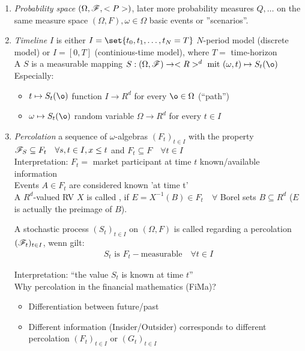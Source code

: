 \begin{enumerate}
	\item \emph{Probability space} $(\Omega,\mathscr F,<P>)$, later more probability measures $Q, \dots$ on the same measure space $(\Omega,F), \omega \in \Omega$ basic events or ''scenarios''.
	
	\newpage
	\item \emph{Timeline} $I$ is either $I=\set{t_0, t_1, \dots, t_N=T}$ $N$-period model (discrete model) or $I = [0,T]$ (continious-time model), where $T = $ time-horizon\\
	
	A  $S$ is a measurable mapping $S: (\O,\F) \to \R^d \mit (\omega, t) \mapsto S_t(\o)$\\
	Especially:
	\begin{itemize}
		\item $t \mapsto S_t(\o)$ function $I \to R^d$ for every $\o \in \O$ (``path'')
		\item $\omega \mapsto S_t(\o)$ random variable $\Omega \to R^d$ for every $t \in I$
	\end{itemize}
	\item \emph{Percolation} 
	a sequence of $\omega$-algebras $(F_t)_{t \in I}$ with the property $\mathscr F_S \subseteq F_t \quad \forall s,t \in I, x \le t$ and $F_t \subseteq F\quad \forall t \in I$\\
	Interpretation: $F_t=$ market participant at time $t$ known/available information\\
	Events $A \in F_t$ are considered known 'at time t'\\
	
	A $R^d$-valued RV $X$ is called  , if $E = X^{-1}(B) \in F_t \quad \forall$ Borel sets $B \subseteq R^d$ ($E$ is actually the preimage of $B$).
	
	\begin{*example}
		A stochastic process  $(S_t)_{t\in I}$ on $(\Omega,F)$ is called  regarding a percolation $(\mathscr F_t)_{t \in I}$, wenn gilt:
		\begin{align*}
			S_t \text{ is } F_t-\text{measurable} \quad \forall t \in I
		\end{align*}
	\end{*example}
	Interpretation: ``the value $S_t$ is known at time $t$''\\
	Why percolation in the financial mathematics (FiMa)?
	\begin{itemize}
		\item Differentiation between future/past
		\item Different information (Insider/Outsider) corresponds to different percolation $(F_t)_{t \in I}$ or $(G_t)_{t\in I}$
	\end{itemize}
	

\end{enumerate}
